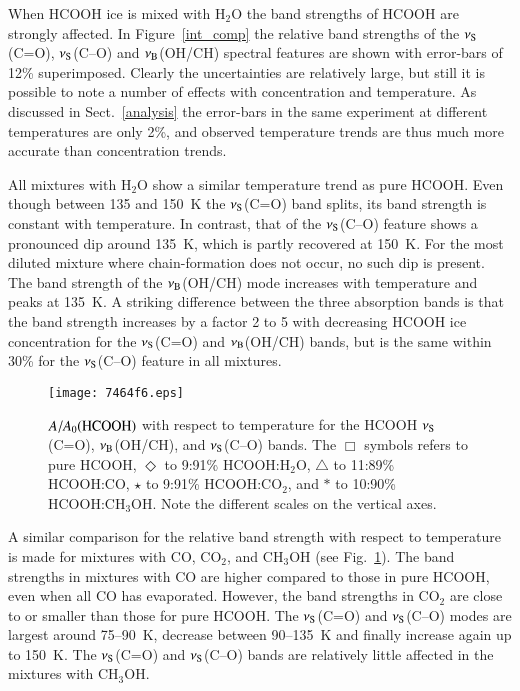 \documentclass{aa}
\begin{document}
When HCOOH ice is mixed with H$_2$O the band strengths of HCOOH are
strongly affected. In Figure~\ref{int_comp} the relative band
strengths of the $\nu_{\rm S}$(C=O), $\nu_{\rm S}$(C--O) and $\nu_{\rm
  B}$(OH/CH) spectral features are shown with error-bars of 12\%
superimposed. Clearly the uncertainties are relatively large, but
still it is possible to note a number of effects with concentration
and temperature. As discussed in Sect.~\ref{analysis} the error-bars
in the same experiment at different temperatures are only 2\%, and
observed temperature trends are thus much more accurate than
concentration trends.

All mixtures with H$_2$O show a similar temperature trend as pure
HCOOH. Even though between 135 and 150~K the $\nu_{\rm S}$(C=O) band
splits, its band strength is constant with temperature. In contrast,
that of the $\nu_{\rm S}$(C--O) feature shows a pronounced dip around
135~K, which is partly recovered at 150~K. For the most diluted
mixture where chain-formation does not occur, no such dip is
present. The band strength of the $\nu_{\rm B}$(OH/CH) mode increases
with temperature and peaks at 135~K. A striking difference between the
three absorption bands is that the band strength increases by a factor
2 to 5 with decreasing HCOOH ice concentration for the $\nu_{\rm
S}$(C=O) and $\nu_{\rm B}$(OH/CH) bands, but is the same within 30\%
for the $\nu_{\rm S}$(C--O) feature in all mixtures.

\begin{figure}
\centering
\texttt{[image: 7464f6.eps]}
\caption{$A/A_0{\rm (HCOOH)}$ with respect to temperature for the
HCOOH $\nu_{\rm S}$(C=O), $\nu_{\rm B}$(OH/CH), and $\nu_{\rm
S}$(C--O) bands. The $\Box$ symbols refers to pure HCOOH, $\Diamond$
to 9:91\% HCOOH:H$_2$O, $\bigtriangleup$ to 11:89\% HCOOH:CO, $\star$
to 9:91\% HCOOH:CO$_2$, and $\ast$ to 10:90\% HCOOH:CH$_3$OH. Note the
different scales on the vertical axes.}
\label{int_comp_mat}
\end{figure}

A similar comparison for the relative band strength with respect to
temperature is made for mixtures with CO, CO$_2$, and CH$_3$OH (see
Fig.~\ref{int_comp_mat}). The band strengths in mixtures with CO are
higher compared to those in pure HCOOH, even when all CO has
evaporated. However, the band strengths in CO$_2$ are close to or
smaller than those for pure HCOOH. The $\nu_{\rm S}$(C=O) and
$\nu_{\rm S}$(C--O) modes are largest around 75--90~K, decrease
between 90--135~K and finally increase again up to 150~K. The
$\nu_{\rm S}$(C=O) and $\nu_{\rm S}$(C--O) bands are relatively little
affected in the mixtures with CH$_3$OH.
\end{document}
